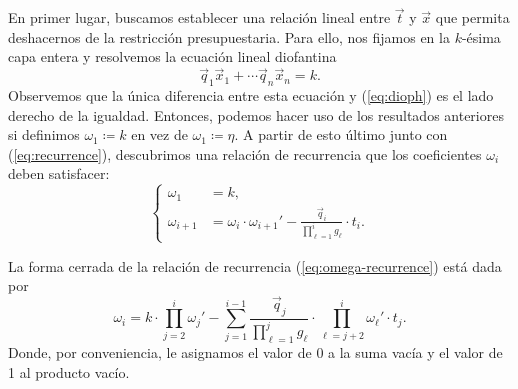 En primer lugar, buscamos establecer una relación lineal entre $\vec{t}$ y $\vec{x}$ que permita
deshacernos de la restricción presupuestaria. Para ello, nos fijamos en la $k$-ésima capa entera y
resolvemos la ecuación lineal diofantina
\begin{equation*}
	\vec{q}_1\vec{x}_1 + \cdots \vec{q}_n\vec{x}_n = k.
\end{equation*}
Observemos que la única diferencia entre esta ecuación y (\ref{eq:dioph}) es el lado derecho de la
igualdad. Entonces, podemos hacer uso de los resultados anteriores si definimos $\omega_1 \coloneq
k$ en vez de $\omega_1 \coloneq \eta$. A partir de esto último junto con (\ref{eq:recurrence}),
descubrimos una relación de recurrencia que los coeficientes $\omega_i$ deben satisfacer:
\begin{equation}
	\label{eq:omega-recurrence}
	\begin{cases}
		\omega_1 &= k, \\
		\omega_{i + 1} &= \omega_i \cdot \omega_{i + 1}' - \frac{\vec{q}_i}{\prod_{\ell=1}^{i}g_\ell} \cdot t_i.
	\end{cases}
\end{equation}
\begin{lemma}
	La forma cerrada de la relación de recurrencia (\ref{eq:omega-recurrence}) está dada por
	\begin{equation}
		\label{eq:omega-formula}
		\omega_i =
		k \cdot \prod_{j=2}^{i} \omega_j'
		- \sum_{j=1}^{i - 1}\frac{\vec{q}_j}{\prod_{\ell=1}^{j}g_\ell}
		\cdot \prod_{\ell=j+2}^{i}\omega_\ell' \cdot t_j.
	\end{equation}
	Donde, por conveniencia, le asignamos el valor de 0 a la suma vacía y el valor de 1 al producto
	vacío.
\end{lemma}
